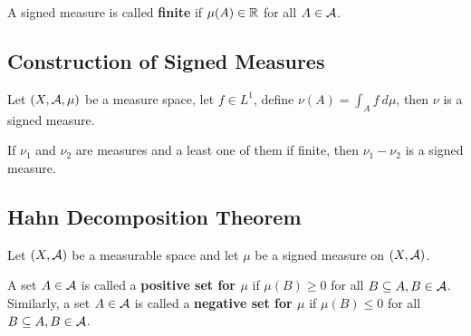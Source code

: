 \documentclass[11pt]{article}
\newcommand{\dmu}[0]{\ d\mu}
\begin{document}
	\begin{definition}
		A signed measure is called \textbf{finite} if $\mu(A) \in \mathbb{R}$ for all $A \in \mathcal{{A}}$.
	\end{definition}
	
	\subsection{Construction of Signed Measures}

	\begin{example}
		Let $(X, \mathcal{{A}}, \mu)$ be a measure space, let $f \in L^1$, define $\nu(A) = \int_A f\dmu$, then $\nu$ is a signed measure.
	\end{example}

	\begin{example}
		If $\nu_1$ and $\nu_2$ are measures and a least one of them if finite, then $\nu_1 - \nu_2$ is a signed measure.
	\end{example}
	
	\subsection{Hahn Decomposition Theorem}
	\par Let $(X, \mathcal{{A}})$ be a measurable space and let $\mu$ be a signed measure on $(X, \mathcal{{A}})$.
	\begin{definition}
		A set $A \in \mathcal{{A}}$ is called a \textbf{positive set for $\mu$} if $\mu(B) \geq 0$ for all $B \subseteq A, B \in \mathcal{{A}}$.
		Similarly, a set $A \in \mathcal{{A}}$ is called a \textbf{negative set for $\mu$} if $\mu(B) \leq 0$ for all $B \subseteq A, B \in \mathcal{{A}}$.
	\end{definition}
	
\end{document}

